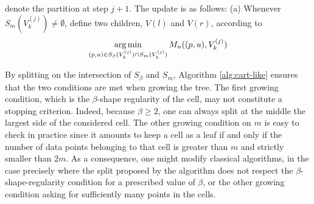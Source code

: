 \documentclass[paper=a4, fontsize=11pt]{scrartcl}
\newcommand{\argmin}{\operatornamewithlimits{\arg\min}}
\begin{document}
\begin{algorithm}[htbp]
\begin{algorithmic}[h]
\Statex{} denote the partition at step $j+1$. The update is as follows: 
\Statex\hspace{\algorithmicindent}\hspace{\algorithmicindent}
(a) Whenever $S_m(V^{(j)}_k) \neq \emptyset $, define two children, $V(l)$ and $V(r)$, according to
$$\argmin_{(p,u) \in S_\beta(V^{(j)}_k)\cap S_m(V^{(j)}_k) } M_n( (p,u) , V^{(j)}_k) $$
\hspace{\algorithmicindent}\hspace{\algorithmicindent}{ If the above optimization problem has no solution, just pick $p$ as the largest side} 
\Statex\hspace{\algorithmicindent}
\Statex \hspace{\algorithmicindent}
\EndFor
\Statex{}
   \EndFor
{}
\end{algorithmic}
\caption{SR trees}
\label{alg:cart-like}
\end{algorithm}

By splitting on the intersection of $S_\beta$ and $S_m$,  Algorithm \ref{alg:cart-like} ensures that the two conditions are met when growing the tree. The first growing condition, which is the $\beta$-shape regularity of the cell, may not constitute a stopping criterion. Indeed, because $\beta\geq 2$, one can always split at the middle the largest side of the considered cell. The other growing condition on $m$ is easy to check in practice since it amounts to keep a cell as a leaf if and only if the number of data points belonging to that cell is greater than $m$ and strictly smaller than $2m$. As a consequence, one might modify classical algorithms, in the case precisely where the split proposed by the algorithm does not respect the $\beta$-shape-regularity condition for a prescribed value of $\beta$, or the other growing condition asking for sufficiently many points in the cells. 
\end{document}
